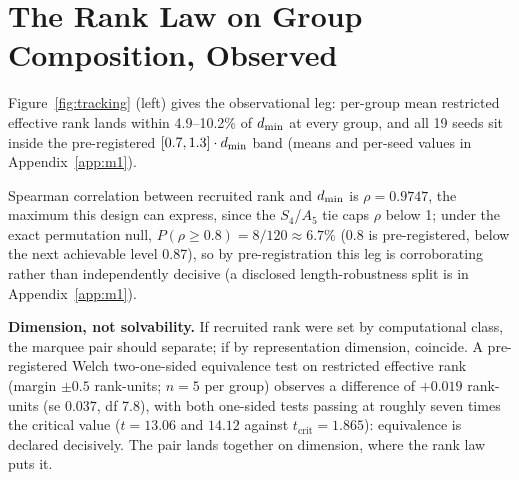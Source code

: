 \section{The Rank Law on Group Composition, Observed}
\label{sec:observed}

Figure~\ref{fig:tracking} (left) gives the observational leg: per-group mean
restricted effective rank lands within 4.9--10.2\% of $d_{\min}$ at every group,
and all 19 seeds sit inside the pre-registered $[0.7, 1.3] \cdot d_{\min}$
band (means and per-seed values in Appendix~\ref{app:m1}).

Spearman correlation between recruited rank and $d_{\min}$ is
$\rho = 0.9747$,
the maximum this design can express, since the $S_4$/$A_5$ tie caps
$\rho$ below 1; under the exact permutation null,
$P(\rho \geq 0.8) = 8/120 \approx 6.7\%$ (0.8 is pre-registered, below the
next achievable level 0.87),
so by pre-registration this leg is corroborating rather than independently
decisive (a disclosed length-robustness split is in
Appendix~\ref{app:m1}).

\textbf{Dimension, not solvability.} If recruited rank were set by
computational class, the marquee pair should separate; if by
representation dimension, coincide. A pre-registered Welch two-one-sided
equivalence test on restricted effective rank (margin $\pm 0.5$
rank-units; $n = 5$ per group) observes a difference of
$+0.019$ rank-units (se 0.037, df 7.8), with both one-sided tests passing
at roughly seven times the critical value ($t = 13.06$ and $14.12$
against $t_{\mathrm{crit}} = 1.865$): equivalence is declared decisively.
The pair lands together on dimension, where the rank law puts it.
